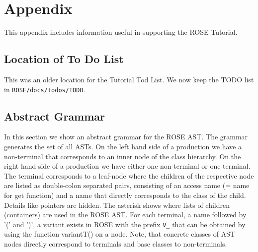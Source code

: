 \chapter{Appendix}

   This appendix includes information useful in supporting 
the ROSE Tutorial.

\section{Location of To Do List}

   This was an older location for the Tutorial Tod List.
We now keep the TODO list in
{\tt ROSE/docs/todos/TODO}.


\section{Abstract Grammar}

In this section we show an abstract grammar for the ROSE AST. The grammar
generates the set of all ASTs. On the left hand side of a production
we have a non-terminal that corresponds to an inner node of the class
hierarchy. On the right hand side of a production we have either one
non-terminal or one terminal. The terminal corresponds to a leaf-node
where the children of the respective node are listed as double-colon
separated pairs, consisting of an access name (= name for get
function) and a name that directly corresponds to the class of the
child. Details like pointers are hidden. The asterisk shows where
lists of children (containers) are used in the ROSE AST. For each terminal, a name followed by '(' and ')', a variant exists in ROSE with the prefix \verb+V_+ that can be obtained by using the function variantT() on a node. Note, that concrete classes of AST nodes directly correspond to terminals and base classes to non-terminals.

